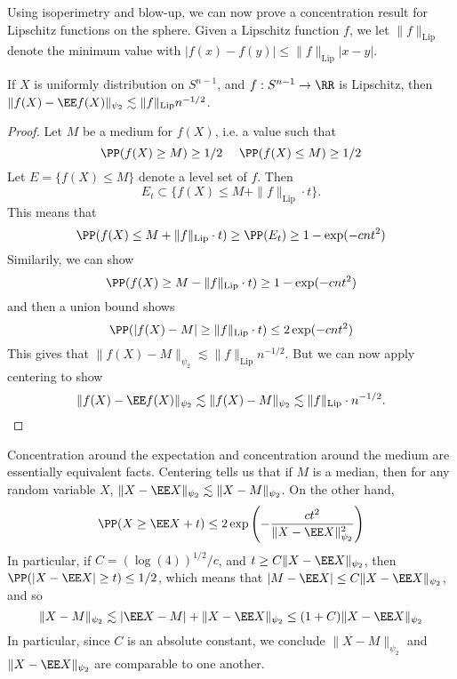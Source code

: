 Using isoperimetry and blow-up, we can now prove a concentration result for Lipschitz functions on the sphere. Given a Lipschitz function $f$, we let $\| f \|_{\text{Lip}}$ denote the minimum value with $|f(x) - f(y)| \leq \| f \|_{\text{Lip}} |x - y|$.

\begin{theorem}
    If $X$ is uniformly distribution on $S^{n-1}$, and $f: S^{n-1} \to \RR$ is Lipschitz, then $\| f(X) - \EE f(X) \|_{\psi_2} \lesssim \| f \|_{\text{Lip}} n^{-1/2}$.
\end{theorem}
\begin{proof}
    Let $M$ be a medium for $f(X)$, i.e. a value such that
    \[ \PP(f(X) \geq M) \geq 1/2\ \ \ \ \PP(f(X) \leq M) \geq 1/2 \]
    Let $E = \{ f(X) \leq M \}$ denote a level set of $f$. Then
    \[ E_t \subset \{ f(X) \leq M + \| f \|_{\text{Lip}} \cdot t \}. \]
    This means that
    \[ \PP(f(X) \leq M + \| f \|_{\text{Lip}} \cdot t ) \geq \PP(E_t) \geq 1 - \exp(-cn t^2 ) \]
    Similarily, we can show
    \[ \PP(f(X) \geq M - \| f \|_{\text{Lip}} \cdot t) \geq 1 - \exp(-cn t^2) \]
    and then a union bound shows
    \[ \PP(|f(X) - M| \geq \| f \|_{\text{Lip}} \cdot t) \leq 2 \exp(-cn t^2) \]
    This gives that $\| f(X) - M \|_{\psi_2} \lesssim \| f \|_{\text{Lip}} n^{-1/2}$. But we can now apply centering to show
    \[ \| f(X) - \EE f(X) \|_{\psi_2} \lesssim \| f(X) - M \|_{\psi_2} \lesssim \| f \|_{\text{Lip}} \cdot n^{-1/2}. \qedhere \]
\end{proof}

\begin{remark}
    Concentration around the expectation and concentration around the medium are essentially equivalent facts. Centering tells us that if $M$ is a median, then for any random variable $X$, $\| X - \EE X \|_{\psi_2} \lesssim \| X - M \|_{\psi_2}$. On the other hand,
    \[ \PP(X \geq \EE X + t) \leq 2 \exp \left( -\frac{c t^2}{\| X - \EE X \|_{\psi_2}^2} \right) \]
    In particular, if $C = (\log(4))^{1/2}/c$, and $t \geq C \| X - \EE X \|_{\psi_2}$, then $\PP(|X - \EE X| \geq t) \leq 1/2$, which means that $|M - \EE X| \leq C \| X - \EE X \|_{\psi_2}$, and so
    \[ \| X - M \|_{\psi_2} \lesssim |\EE X - M| + \| X - \EE X \|_{\psi_2} \leq (1 + C) \| X - \EE X \|_{\psi_2} \]
    In particular, since $C$ is an absolute constant, we conclude $\| X - M \|_{\psi_2}$ and $\| X - \EE X \|_{\psi_2}$ are comparable to one another.
\end{remark}


